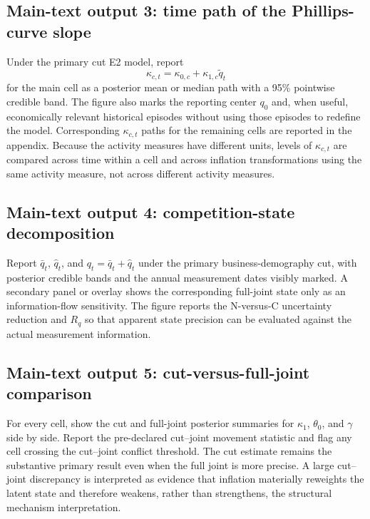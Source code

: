 \documentclass[11pt]{article}
\begin{document}
\subsection{Main-text output 3: time path of the Phillips-curve slope}
Under the primary cut E2 model, report
\begin{equation}
\kappa_{c,t}=\kappa_{0,c}+\kappa_{1,c}\tilde q_t
\label{eq:reported_kappa_path}
\end{equation}
for the main cell as a posterior mean or median path with a 95\% pointwise credible band. The figure also marks the reporting center $q_0$ and, when useful, economically relevant historical episodes without using those episodes to redefine the model. Corresponding $\kappa_{c,t}$ paths for the remaining cells are reported in the appendix. Because the activity measures have different units, levels of $\kappa_{c,t}$ are compared across time within a cell and across inflation transformations using the same activity measure, not across different activity measures.

\subsection{Main-text output 4: competition-state decomposition}
Report $\bar q_t$, $\hat q_t$, and $q_t=\bar q_t+\hat q_t$ under the primary business-demography cut, with posterior credible bands and the annual measurement dates visibly marked. A secondary panel or overlay shows the corresponding full-joint state only as an information-flow sensitivity. The figure reports the N-versus-C uncertainty reduction and $R_q$ so that apparent state precision can be evaluated against the actual measurement information.

\subsection{Main-text output 5: cut-versus-full-joint comparison}
For every cell, show the cut and full-joint posterior summaries for $\kappa_1$, $\theta_0$, and $\gamma$ side by side. Report the pre-declared cut--joint movement statistic and flag any cell crossing the cut--joint conflict threshold. The cut estimate remains the substantive primary result even when the full joint is more precise. A large cut--joint discrepancy is interpreted as evidence that inflation materially reweights the latent state and therefore weakens, rather than strengthens, the structural mechanism interpretation.
\end{document}
